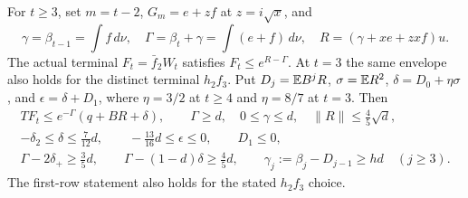 \begin{lemma}
\label{lem:odd-two:packet}
For \(t\ge3\), set \(m=t-2\), \(G_m=e+zf\) at
\(z=i\sqrt x\), and
\[
 \gamma=\beta_{t-1}=\int f\,d\nu,\quad
 \Gamma=\beta_t+\gamma=\int(e+f)\,d\nu,\quad
 R=(\gamma+x e+zx f)u.
\]
The actual terminal \(F_t=\bar f_2W_t\) satisfies
\(F_t\le e^{R-\Gamma}\). At \(t=3\) the same envelope also
holds for the distinct terminal \(h_2f_3\).
Put \(D_j=\mathbb E B^jR\), \(\sigma=\mathbb E R^2\),
\(\delta=D_0+\eta\sigma\), and \(\epsilon=\delta+D_1\), where
\(\eta=3/2\) at \(t\ge4\) and \(\eta=8/7\) at \(t=3\).
Then
\begin{equation}\label{eq:odd-two:packet}
\begin{gathered}
 TF_t\le e^{-\Gamma}(q+BR+\delta),\qquad
 \Gamma\ge d,\quad0\le\gamma\le d,\quad\|R\|\le\tfrac45\sqrt d,\\
 -\delta_2\le\delta\le\tfrac7{12}d,\qquad
 -\tfrac{13}{16}d\le\epsilon\le0,\qquad D_1\le0,\\
 \Gamma-2\delta_+\ge\tfrac35d,\qquad
 \Gamma-(1-d)\delta\ge\tfrac45d,\qquad
 \gamma_j:=\beta_j-D_{j-1}\ge hd\quad(j\ge3).
\end{gathered}
\end{equation}
The first-row statement also holds for the stated \(h_2f_3\) choice.
\end{lemma}
